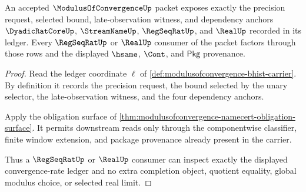 \begin{theorem}\label{thm:modulusofconvergence-ledger-exactness}
An accepted $\ModulusOfConvergenceUp$ packet exposes exactly the precision
request, selected bound, late-observation witness, and dependency anchors
$\DyadicRatCoreUp$, $\StreamNameUp$, $\RegSeqRatUp$, and $\RealUp$ recorded in
its ledger. Every $\RegSeqRatUp$ or $\RealUp$ consumer of the packet factors
through those rows and the displayed $\hsame$, $\Cont$, and $\mathsf{Pkg}$
provenance.
\end{theorem}
\begin{proof}
Read the ledger coordinate $\ell$ of
\autoref{def:modulusofconvergence-bhist-carrier}. By definition it records the
precision request, the bound selected by the unary selector, the
late-observation witness, and the four dependency anchors.

Apply the obligation surface of
\autoref{thm:modulusofconvergence-namecert-obligation-surface}. It permits
downstream reads only through the componentwise classifier, finite window
extension, and package provenance already present in the carrier.

Thus a $\RegSeqRatUp$ or $\RealUp$ consumer can inspect exactly the displayed
convergence-rate ledger and no extra completion object, quotient equality,
global modulus choice, or selected real limit.
\end{proof}

